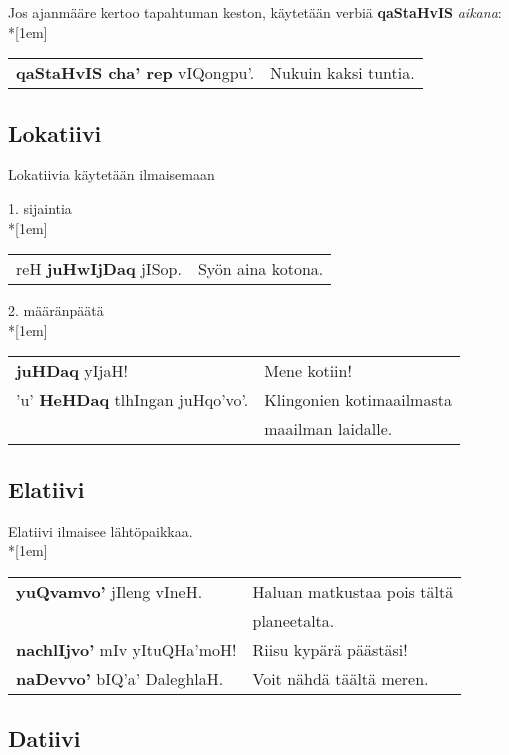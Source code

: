 \documentclass{book}
\begin{document}
Jos ajanmääre kertoo tapahtuman keston, käytetään verbiä \textbf{qaStaHvIS} \textit{aikana}:\\*[1em]
\begin{tabular}{l l}
    \textbf{qaStaHvIS cha' rep} vIQongpu'. & Nukuin kaksi tuntia. \\
\end{tabular}

\subsection{Lokatiivi}

Lokatiivia käytetään ilmaisemaan

1. sijaintia\\*[1em]
\begin{tabular}{l l}
    reH \textbf{juHwIjDaq} jISop. & Syön aina kotona. \\
\end{tabular}

2. määränpäätä\\*[1em]
\begin{tabular}{l l}
    \textbf{juHDaq} yIjaH! & Mene kotiin! \\
    'u' \textbf{HeHDaq} tlhIngan juHqo'vo'. & Klingonien kotimaailmasta \\
    & maailman laidalle. \\
\end{tabular}

\subsection{Elatiivi}

Elatiivi ilmaisee lähtöpaikkaa.\\*[1em]
\begin{tabular}{l l}
    \textbf{yuQvamvo'} jIleng vIneH. & Haluan matkustaa pois tältä \\
    & planeetalta. \\
    \textbf{nachlIjvo'} mIv yItuQHa'moH! & Riisu kypärä päästäsi! \\
    \textbf{naDevvo'} bIQ'a' DaleghlaH. & Voit nähdä täältä meren. \\
\end{tabular}

\subsection{Datiivi}
\end{document}
